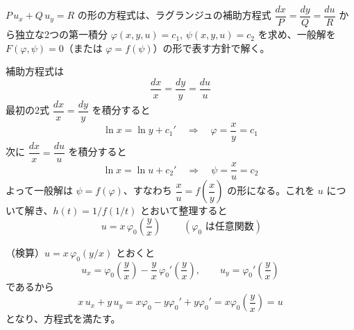 
$P\,u_{x} + Q\,u_{y} = R$ の形の方程式は、ラグランジュの補助方程式
$\dfrac{dx}{P} = \dfrac{dy}{Q} = \dfrac{du}{R}$ から独立な2つの第一積分
$\varphi(x,y,u) = c_{1}$, $\psi(x,y,u) = c_{2}$ を求め、一般解を
$F(\varphi, \psi) = 0$（または $\varphi = f(\psi)$）の形で表す方針で解く。

補助方程式は
\[
\frac{dx}{x} = \frac{dy}{y} = \frac{du}{u}
\]
最初の2式 $\dfrac{dx}{x} = \dfrac{dy}{y}$ を積分すると
\[
\ln x = \ln y + c_{1}' \quad\Longrightarrow\quad \varphi = \frac{x}{y} = c_{1}
\]
次に $\dfrac{dx}{x} = \dfrac{du}{u}$ を積分すると
\[
\ln x = \ln u + c_{2}' \quad\Longrightarrow\quad \psi = \frac{x}{u} = c_{2}
\]
よって一般解は $\psi = f(\varphi)$、すなわち $\dfrac{x}{u} = f\!\left(\dfrac{x}{y}\right)$ の形になる。これを $u$ について解き、$h(t) = 1/f(1/t)$ とおいて整理すると
\[
\boxed{\; u = x\,\varphi_{0}\!\left(\frac{y}{x}\right) \;}
\qquad (\varphi_{0} \text{ は任意関数})
\]

（検算）$u = x\,\varphi_{0}(y/x)$ とおくと
\[
u_{x} = \varphi_{0}\!\left(\frac{y}{x}\right) - \frac{y}{x}\,\varphi_{0}'\!\left(\frac{y}{x}\right), \qquad
u_{y} = \varphi_{0}'\!\left(\frac{y}{x}\right)
\]
であるから
\[
x\,u_{x} + y\,u_{y}
= x\varphi_{0} - y\varphi_{0}' + y\varphi_{0}'
= x\varphi_{0}\!\left(\frac{y}{x}\right) = u
\]
となり、方程式を満たす。
